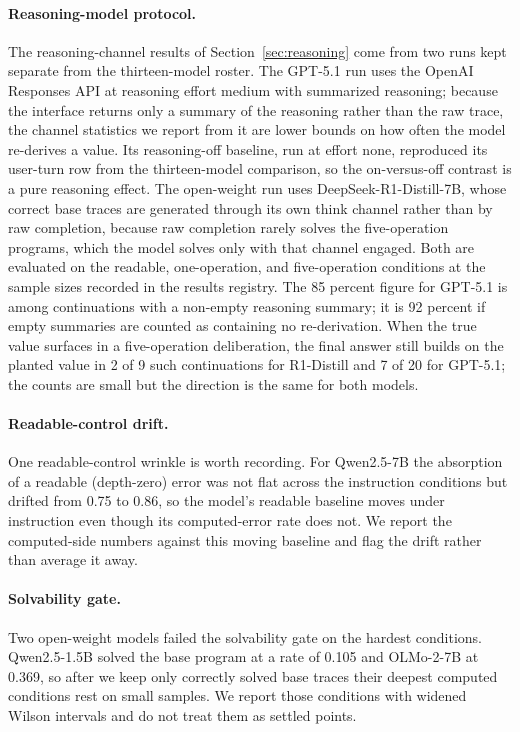 \paragraph{Reasoning-model protocol.}
The reasoning-channel results of Section~\ref{sec:reasoning} come from two runs kept separate from the thirteen-model roster. The GPT-5.1 run uses the OpenAI Responses API at reasoning effort medium with summarized reasoning; because the
interface returns only a summary of the reasoning rather than the raw trace, the
channel statistics we report from it are lower bounds on how often the model
re-derives a value. Its reasoning-off baseline, run at effort none, reproduced its user-turn row from the thirteen-model comparison, so the on-versus-off contrast is a pure reasoning effect. The open-weight run uses DeepSeek-R1-Distill-7B, whose correct base traces are generated through its own think channel rather than by raw completion, because raw completion rarely solves the five-operation programs, which the model solves only with that channel engaged. Both are evaluated on the readable, one-operation, and five-operation conditions at the sample sizes recorded in the results registry. The 85 percent figure for GPT-5.1 is among continuations with a non-empty reasoning summary; it is 92 percent if empty summaries are counted as containing no re-derivation. When the true value surfaces in a five-operation deliberation, the final answer still builds on the planted value in 2 of 9 such continuations for R1-Distill and 7 of 20 for GPT-5.1; the counts are small but the direction is the same for both models.

\paragraph{Readable-control drift.}
One readable-control wrinkle is worth recording. For Qwen2.5-7B the absorption
of a readable (depth-zero) error was not flat across the instruction conditions but drifted from 0.75 to 0.86, so the model's readable baseline moves under
instruction even though its computed-error rate does not. We report the
computed-side numbers against this moving baseline and flag the drift rather
than average it away.

\paragraph{Solvability gate.}
Two open-weight models failed the solvability gate on the hardest conditions.
Qwen2.5-1.5B solved the base program at a rate of 0.105 and OLMo-2-7B at 0.369,
so after we keep only correctly solved base traces their deepest computed conditions
rest on small samples. We report those conditions with widened Wilson intervals and
do not treat them as settled points.

